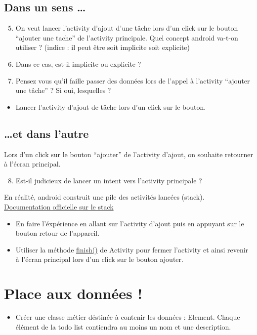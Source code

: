 \documentclass{article}
\begin{document}
\subsection{Dans un sens \ldots}
\begin{enumerate}
 \setcounter{enumi}{4}
\item On veut lancer l'activity d'ajout d'une tâche lors d'un click sur le
bouton ``ajouter une tache'' de l'activity principale.
Quel concept android va-t-on utiliser ? (indice : il peut être soit implicite
soit explicite)
\item Dans ce cas, est-il implicite ou explicite ?
\item Pensez vous qu'il faille passer des données lors de l'appel à l'activity ``ajouter une tâche'' ? Si oui, lesquelles ?
\end{enumerate}
\begin{itemize}
  \item Lancer l'activity d'ajout de tâche lors d'un click sur le bouton.
\end{itemize}
\subsection{\ldots et dans l'autre}

Lors d'un click sur le bouton ``ajouter'' de l'activity d'ajout, on souhaite retourner à l'écran principal.
 \begin{enumerate}
 \setcounter{enumi}{7}
\item Est-il judicieux de lancer un intent vers l'activity principale ? 
\end{enumerate}
 En réalité, android construit une pile des activités lancées (stack). \href{http://developer.android.com/guide/components/tasks-and-back-stack.html}{Documentation officielle sur le stack} 
  \begin{itemize}
  \item En faire l'éxpérience en allant sur l'activity d'ajout puis en appuyant
  sur le bouton retour de l'appareil.
  \item Utiliser la méthode
  \href{http://developer.android.com/reference/android/app/Activity.html#finish()}{finish()} de Activity pour fermer l'activity et ainsi revenir à l'écran principal lors d'un click sur le bouton ajouter.
 \end{itemize}
 
 \section{Place aux données !}
 \begin{itemize}
  \item Créer une classe métier déstinée à contenir les données : Element.
  Chaque élément de la todo list contiendra au moins un nom et une description.
 \end{itemize}
\end{document}
